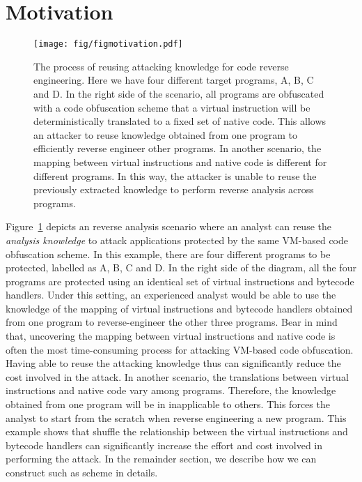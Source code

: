 \section{Motivation}
\label{sec:motivation}
\begin{figure}[!t]
\centering
\texttt{[image: fig/figmotivation.pdf]}
\caption{The process of reusing attacking knowledge for code reverse engineering.
Here we have four different target programs, A, B, C and D.
In the right side of the scenario, all programs are obfuscated with a code obfuscation scheme that a virtual instruction will be deterministically translated to a fixed set of native code.
This allows an attacker to reuse knowledge obtained from one program to efficiently reverse engineer other programs.
In another scenario, the mapping between virtual instructions and native code is different for different programs.
In this way, the attacker is  unable to reuse the previously extracted knowledge to perform reverse analysis across programs.}
\label{fig:motivation}
\end{figure}

Figure~\ref{fig:motivation} depicts an reverse analysis scenario where an analyst can
reuse the \textit{analysis knowledge} to attack applications protected by
the same VM-based code obfuscation scheme. In this example, there are four different programs
to be protected, labelled as A, B, C and D. In the right side of the diagram,
all the four programs are protected using an identical set of virtual
instructions and bytecode handlers. Under this setting, an experienced analyst would be able to
use the knowledge of the mapping of virtual instructions and bytecode handlers obtained
from one program to reverse-engineer the other three programs. Bear in mind that,
uncovering the mapping between virtual instructions and native code is often the most
time-consuming process for attacking VM-based code obfuscation. Having able to
reuse the attacking knowledge thus can significantly reduce the cost involved in the
attack.
In another scenario, the translations between virtual instructions and native code
vary among programs. Therefore, the knowledge obtained from one program will be in inapplicable to others.
This forces the analyst to start from the scratch when reverse engineering a new program.
This example shows that shuffle the relationship between the virtual instructions and bytecode handlers
can significantly increase the effort and cost involved in performing the attack.
In the remainder section, we describe how we can construct such as scheme in details.



